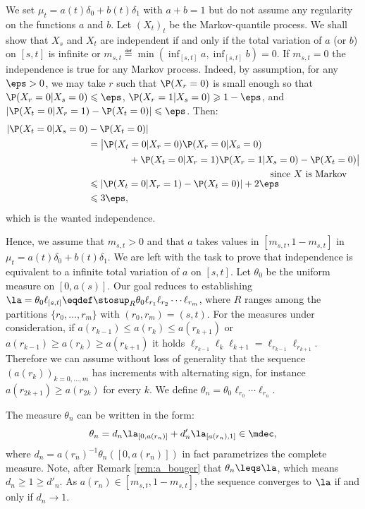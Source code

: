 \begin{ex}\label{ex:two_atoms}
We set $\mu_t=a(t)\delta_0+b(t)\delta_1$ with $a+b=1$ but do not assume any regularity on the functions $a$ and $b$. Let $(X_t)_t$ be the Markov-quantile process. We shall show that $X_s$ and $X_t$ are independent if and only if the total variation of $a$ (or $b$) on $[s,t]$ is infinite or $m_{s,t}\eqdef \min(\inf_{[s,t]}a,\inf_{[s,t]} b)=0$. If $m_{s,t}=0$ the independence is true for any Markov process. Indeed, by assumption, for any $\eps>0$, we may take $r$ such that $\P(X_r=0)$ is small enough so that $\P(X_r=0|X_s=0)\leqslant\eps$, $\P(X_r=1|X_s=0)\geqslant1-\eps$, and $|\P(X_t=0|X_r=1)-\P(X_t=0)|\leqslant\eps$. Then:\vspace*{-3pt}
\begin{align*}
|\P(X_t=0|X_s=0)&-\P(X_t=0)|\\
&=\bigl|\P(X_t=0|X_r=0)\P(X_r=0|X_s=0)\\
&\hspace*{1.5cm}+\P(X_t=0|X_r=1)\P(X_r=1|X_s=0)-\P(X_t=0)\bigr|\\ &\hspace*{6.7cm}\text{since $X$ is Markov}\\[-5pt]
&\leqslant|\P(X_t=0|X_r=1)-\P(X_t=0)|+2\eps\\
&\leqslant3\eps,
\end{align*}
which is the wanted independence.

Hence, we assume that $m_{s,t}>0$ and that $a$ takes values in $[m_{s,t},1-m_{s,t}]$ in $\mu_t=a(t)\delta_0+b(t)\delta_1$. We are left with the task to prove that independence is equivalent to a infinite total variation of $a$ on $[s,t]$. Let $\theta_0$ be the uniform measure on $[0,a(s)]$. Our goal reduces to establishing $\la=\theta_0 \ell_{[s,t]}\eqdef\stosup_R \theta_0\ell_{r_1}\ell_{r_2}\cdots \ell_{r_m}$, where $R$ ranges among the partitions $\{r_0,\ldots, r_m\}$ with $(r_0,r_m)=(s,t)$. For the measures under consideration, if $a(r_{k-1})\leq a(r_k)\leq a(r_{k+1})$ or $a(r_{k-1})\geq a(r_k)\geq a(r_{k+1})$ it holds $\ell_{r_{k-1}} \ell_k \ell_{k+1}=\ell_{r_{k-1}} \ell_{r_{k+1}}$. Therefore we can assume without loss of generality that the sequence $(a(r_k))_{k=0,\ldots,m}$ has increments with alternating sign, for instance $a(r_{2k+1})\geq a(r_{2k})$ for every $k$. We define $\theta_n=\theta_0 \ell_{r_0}\cdots \ell_{r_n}$.

The measure $\theta_n$ can be written in the form:\vspace*{-3pt}
\[
\theta_n=d_n\la_{[0,a(r_n)]}+d'_n\la_{[a(r_n),1]}\in \mdec,
\]
where $d_n=a(r_n)^{-1}\theta_n([0,a(r_n)])$ in fact parametrizes the complete measure. Note, after Remark \ref{rem:a_bouger} that $\theta_n\leqs \la$, which means $d_n\geq 1\geq d'_n$. As $a(r_n)\in[m_{s,t}, 1-m_{s,t}]$, the sequence converges to $\la$ if and only if $d_n\to 1$.


\end{ex}
